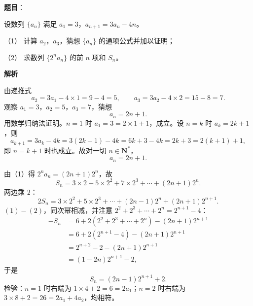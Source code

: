 \begin{answer}

\textbf{题目}：

设数列 $\{a_n\}$ 满足 $a_1=3$，$a_{n+1}=3a_n-4n$。

（1） 计算 $a_2$，$a_3$，猜想 $\{a_n\}$ 的通项公式并加以证明；

（2） 求数列 $\{2^na_n\}$ 的前 $n$ 项和 $S_n$。

\textbf{解析}


由递推式
\nopagebreak[4]
\[a_2=3a_1-4\times1=9-4=5,\qquad a_3=3a_2-4\times2=15-8=7 .\]
观察 $a_1=3$，$a_2=5$，$a_3=7$，猜想
\nopagebreak[4]
\[a_n=2n+1 .\]
用数学归纳法证明。$n=1$ 时 $a_1=3=2\times1+1$，成立。设 $n=k$ 时 $a_k=2k+1$，则
\nopagebreak[4]
\[a_{k+1}=3a_k-4k=3(2k+1)-4k=6k+3-4k=2k+3=2(k+1)+1,\]
即 $n=k+1$ 时也成立。故对一切 $n\in\mathbf N^*$，
\nopagebreak[4]
\[a_n=2n+1 .\]


由（1）得 $2^na_n=(2n+1)2^n$，故
\nopagebreak[4]
\[S_n=3\times2+5\times2^2+7\times2^3+\cdots+(2n+1)2^n. \tag{1}\]
两边乘 $2$：
\nopagebreak[4]
\[2S_n=3\times2^2+5\times2^3+\cdots+(2n-1)2^n+(2n+1)2^{n+1}. \tag{2}\]
$(1)-(2)$，同次幂相减，并注意 $2^2+2^3+\cdots+2^n=2^{n+1}-4$：
\nopagebreak[4]
\[\begin{aligned}
-S_n&=6+2\left(2^2+2^3+\cdots+2^n\right)-(2n+1)2^{n+1}\\
&=6+2\left(2^{n+1}-4\right)-(2n+1)2^{n+1}\\
&=2^{n+2}-2-(2n+1)2^{n+1}\\
&=(1-2n)2^{n+1}-2,
\end{aligned}\]
于是
\nopagebreak[4]
\[S_n=(2n-1)2^{n+1}+2 .\]
检验：$n=1$ 时右端为 $1\times4+2=6=2a_1$；$n=2$ 时右端为 $3\times8+2=26=2a_1+4a_2$，均相符。



\end{answer}
